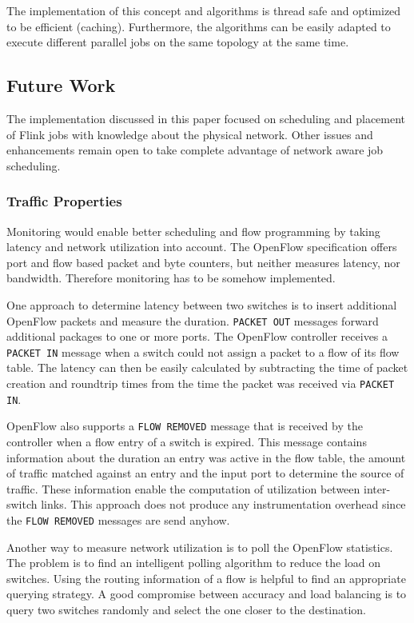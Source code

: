 The implementation of this concept and algorithms is thread safe and optimized to be efficient
(caching). Furthermore, the algorithms can be easily adapted to execute different parallel jobs on
the same topology at the same time.

\subsection{Future Work}
The implementation discussed in this paper focused on scheduling and placement of Flink jobs with
knowledge about the physical network. Other issues and enhancements remain open to take complete
advantage of network aware job scheduling.

\subsubsection{Traffic Properties}
Monitoring would enable better scheduling and flow programming by taking latency and network
utilization into account. The OpenFlow specification \cite{openflow} offers port and flow based
packet and byte counters, but neither measures latency, nor bandwidth. Therefore monitoring has to
be somehow implemented.

One approach to determine latency between two switches is to insert additional OpenFlow packets and
measure the duration.  \texttt{PACKET OUT} messages forward additional packages to one or more
ports.  The OpenFlow controller receives a \texttt{PACKET IN} message when a switch could not assign
a packet to a flow of its flow table. The latency can then be easily calculated by subtracting the
time of packet creation and roundtrip times from the time the packet was received via \texttt{PACKET
IN}. \cite{monitoringlatency} \cite{opennetmon}

OpenFlow also supports a \texttt{FLOW REMOVED} message that is received by the controller when a
flow entry of a switch is expired. This message contains information about the duration an entry
was active in the flow table, the amount of traffic matched against an entry and the input port to
determine the source of traffic.  These information enable the computation of utilization between
inter-switch links. This approach does not produce any instrumentation overhead since the
\texttt{FLOW REMOVED} messages are send anyhow. \cite{flowsense}

Another way to measure network utilization is to poll the OpenFlow statistics. The problem is to
find an intelligent polling algorithm to reduce the load on switches. Using the routing information
of a flow is helpful to find an appropriate querying strategy.  A good compromise between accuracy
and load balancing is to query two switches randomly and select the one closer to the destination.
\cite{opentm} \cite{opennetmon}

